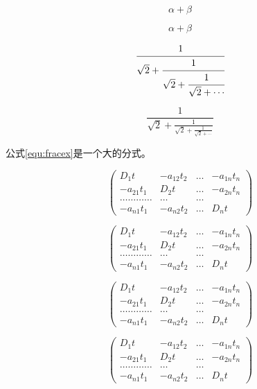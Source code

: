 \documentclass[lang=chs,degree=master,blindreview=true,winfonts=true]{yanputhesis}
\begin{document}
\[\alpha + \beta\]

\begin{equation}
\alpha +\beta
\end{equation}

\[\cfrac{1}{\sqrt{2}+\cfrac{1}{\sqrt{2}+\cfrac{1}{\sqrt{2}+\cdots}}}\]

\begin{equation}
\frac{1}{\sqrt{2}+\frac{1}{\sqrt{2}+\frac{1}{\sqrt{2}+\cdots}}}\label{equ:fracex}
\end{equation}

公式\eqref{equ:fracex}是一个大的分式。

\begin{equation}
\left(\begin{array}{cccc}
D_{1} t & -a_{12} t_{2} & \ldots & -a_{1 n} t_{n} \\
-a_{21} t_{1} & D_{2} t & \ldots & -a_{2 n} t_{n} \\
\ldots \ldots \ldots \ldots & \ldots & \ldots \\
-a_{n 1} t_{1} & -a_{n 2} t_{2} & \ldots & D_{n} t
\end{array}\right)
\end{equation}

\begin{equation}
\begin{pmatrix}
D_{1} t & -a_{12} t_{2} & \ldots & -a_{1 n} t_{n} \\
-a_{21} t_{1} & D_{2} t & \ldots & -a_{2 n} t_{n} \\
\ldots \ldots \ldots \ldots & \ldots & \ldots \\
-a_{n 1} t_{1} & -a_{n 2} t_{2} & \ldots & D_{n} t
\end{pmatrix}
\end{equation}

\begin{equation}
\begin{pmatrix}
D_{1} t & -a_{12} t_{2} & \ldots & -a_{1 n} t_{n} \\
-a_{21} t_{1} & D_{2} t & \ldots & -a_{2 n} t_{n} \\
\ldots \ldots \ldots \ldots & \ldots & \ldots \\
-a_{n 1} t_{1} & -a_{n 2} t_{2} & \ldots & D_{n} t
\end{pmatrix}
\end{equation}


\begin{equation}
\begin{pmatrix}
D_{1} t & -a_{12} t_{2} & \ldots & -a_{1 n} t_{n} \\
-a_{21} t_{1} & D_{2} t & \ldots & -a_{2 n} t_{n} \\
\ldots \ldots \ldots \ldots & \ldots & \ldots \\
-a_{n 1} t_{1} & -a_{n 2} t_{2} & \ldots & D_{n} t
\end{pmatrix}
\end{equation}
\end{document}

